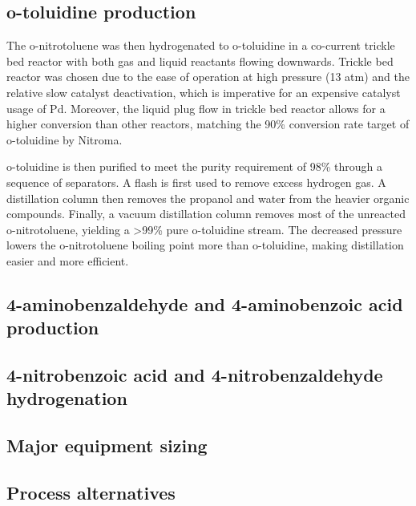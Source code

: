 \subsection{o-toluidine production}
The o-nitrotoluene was then hydrogenated to o-toluidine in a co-current trickle bed reactor with both gas and liquid reactants flowing downwards. Trickle bed reactor was chosen due to the ease of operation at high pressure (13 atm) and the relative slow catalyst deactivation, which is imperative for an expensive catalyst usage of Pd. Moreover, the liquid plug flow in trickle bed reactor allows for a higher conversion than other reactors, matching the 90\% conversion rate target of o-toluidine by Nitroma. 

o-toluidine is then purified to meet the purity requirement of 98\% through a sequence of separators. A flash is first used to remove excess hydrogen gas. A distillation column then removes the propanol and water from the heavier organic compounds. Finally, a vacuum distillation column removes most of the unreacted o-nitrotoluene, yielding a >99\% pure o-toluidine stream. The decreased pressure lowers the o-nitrotoluene boiling point more than o-toluidine, making distillation easier and more efficient.  
 
\subsection{4-aminobenzaldehyde and 4-aminobenzoic acid production}

\subsection{4-nitrobenzoic acid and 4-nitrobenzaldehyde hydrogenation}


\subsection{Major equipment sizing}

\subsection{Process alternatives}


